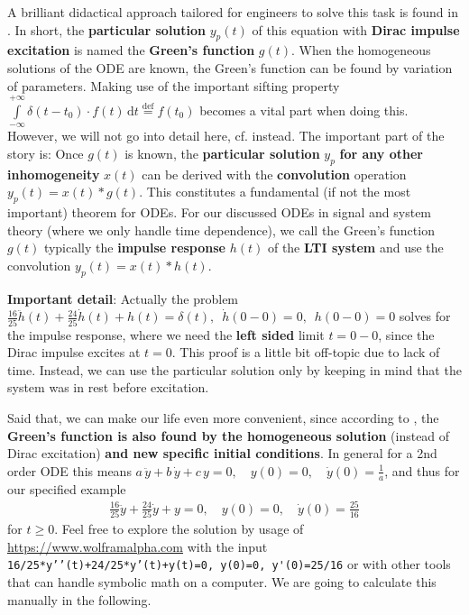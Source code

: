\documentclass[11pt,a4paper,DIV=12]{scrartcl}
\begin{document}
%
A brilliant didactical approach tailored for engineers to solve this task is
found in \cite{Strang2014}.
%
In short, the \textbf{particular solution} $y_p(t)$ of this equation
with \textbf{Dirac impulse excitation} is named the \textbf{Green's function} $g(t)$.
%
When the homogeneous solutions of the ODE are known, the Green's function can be found
by variation of parameters.
Making use of the important sifting property
$\int\limits_{-\infty}^{+\infty} \delta(t-t_0) \cdot f(t) \, \mathrm{d} t \stackrel{\mathrm{def}}= f(t_0)$
becomes a vital part when doing this.
%
However, we will not go into detail here, cf. \cite[p.133]{Strang2014} instead.
%
\label{pg:sig_sys_ex_03AddOn:convolution}
The important part of the story is:
Once $g(t)$ is known,
the \textbf{particular solution} $y_p$ \textbf{for any other inhomogeneity}
$x(t)$ can be derived with the \textbf{convolution} operation
$y_p(t) = x(t) * g(t)$.
%
This constitutes a fundamental (if not the most important) theorem for ODEs.
%
For our discussed ODEs in signal and
system theory (where we only handle time dependence), we call the Green's
function $g(t)$ typically the \textbf{impulse response} $h(t)$ of the
\textbf{LTI system} and use the convolution $y_p(t) = x(t) * h(t)$.

\textbf{Important detail}: Actually the problem
$\frac{16}{25} \ddot{h}(t) + \frac{24}{25} \dot{h}(t) + h(t) = \delta(t),\,\,\,
\dot{h}(0-0)=0,\,\,\,h(0-0)=0$
solves for the impulse response, where we need the \textbf{left sided}
limit $t=0-0$, since the Dirac impulse excites at $t=0$.
%
This proof is a little bit off-topic due to lack of time.
%
Instead, we can use the particular solution only by keeping in
mind that the system was in rest before excitation.

Said that, we can make our life even more convenient, since according to
\cite[p.97]{Strang2014},
the \textbf{Green's function is also found by the homogeneous solution}
(instead of Dirac excitation)
\textbf{and new specific initial conditions}.
In general for a 2nd order ODE this means
$a \, \ddot{y} + b \, \dot{y} + c \, y = 0,
\quad y(0)=0,
\quad \dot{y}(0)=\frac{1}{a}$,
and thus for our specified example
\begin{align}
\frac{16}{25} \ddot{y} + \frac{24}{25} \dot{y} + y = 0,
\quad y(0)=0,
\quad \dot{y}(0)=\frac{25}{16}
\end{align}
for $t\geq 0$.
%
Feel free to explore the solution by usage of \url{https://www.wolframalpha.com}
with the input \verb|16/25*y’’(t)+24/25*y’(t)+y(t)=0, y(0)=0, y'(0)=25/16|
or with other tools that can handle symbolic math on a computer.
%
We are going to calculate this manually in the following.
%
\end{document}
